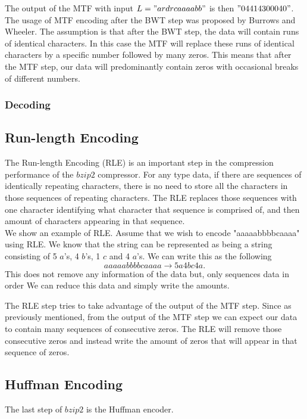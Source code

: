 \documentclass{article}
\begin{document}
The output of the MTF with input \(L = "ardrcaaaabb"\) is then \("04414300040"\). The usage of MTF encoding after the BWT step was proposed by Burrows and Wheeler. The assumption is that after the BWT step, the data will contain runs of identical characters. In this case the MTF will replace these runs of identical characters by a specific number followed by many zeros. This means that after the MTF step, our data will predominantly contain zeros with occasional breaks of different numbers.

\subsubsection{Decoding}


\subsection{Run-length Encoding}
The Run-length Encoding (RLE) is an important step in the compression performance of the \(bzip2\) compressor.
For any type data, if there are sequences of identically repeating characters, there is no need to store all the characters in those sequences of repeating characters. The RLE replaces those sequences with one character identifying what character that sequence is comprised of, and then amount of characters appearing in that sequence.\\
We show an example of RLE. Assume that we wish to encode "aaaaabbbbcaaaa" using RLE. We know that the string can be represented as being a string consisting of 5 \(a\)'s, 4 \(b\)'s, 1 \(c\) and 4 \(a\)'s. We can write this as the following
\[
aaaaabbbbcaaaa \rightarrow 5a4bc4a.
\]
This does not remove any information of the data but, only sequences data in order We can reduce this data and simply write the amounts. 

The RLE step tries to take advantage of the output of the MTF step. Since as previously mentioned, from the output of the MTF step we can expect our data to contain many sequences of consecutive zeros. The RLE will remove those consecutive zeros and instead write the amount of zeros that will appear in that sequence of zeros.





\subsection{Huffman Encoding}
The last step of \(bzip2\) is the Huffman encoder.
\end{document}
